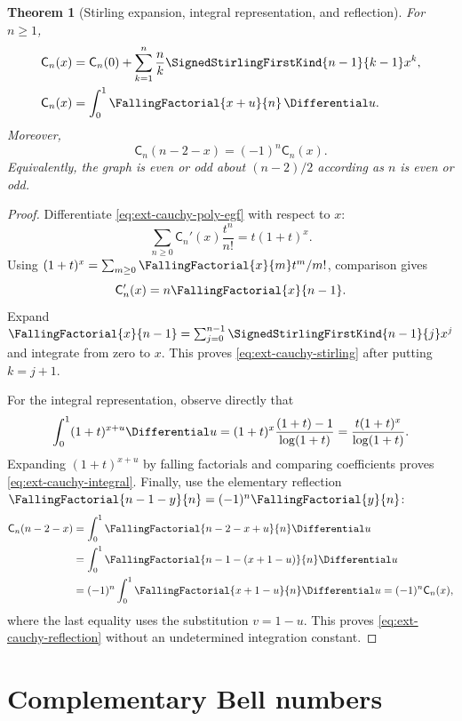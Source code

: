 \documentclass[11pt,a4paper,oneside,openany]{book}
\newtheorem{theorem}{Theorem}[chapter]
\theoremstyle{definition}
\theoremstyle{remark}
\begin{document}
\begin{theorem}[Stirling expansion, integral representation, and reflection]
For \(n\ge1\),
\begin{align}
 \mathsf C_n(x)&=\mathsf C_n(0)
 +\sum_{k=1}^n\frac{n}{k}\SignedStirlingFirstKind{n-1}{k-1}x^k,
 \label{eq:ext-cauchy-stirling}\\
 \mathsf C_n(x)&=\int_0^1\FallingFactorial{x+u}{n}\,\Differential u.
 \label{eq:ext-cauchy-integral}
\end{align}
Moreover,
\begin{equation}\label{eq:ext-cauchy-reflection}
 \mathsf C_n(n-2-x)=(-1)^n\mathsf C_n(x).
\end{equation}
Equivalently, the graph is even or odd about \((n-2)/2\) according as \(n\)
is even or odd.
\end{theorem}
\begin{proof}
Differentiate \eqref{eq:ext-cauchy-poly-egf} with respect to \(x\):
\[
 \sum_{n\ge0}\mathsf C_n'(x)\frac{t^n}{n!}
 =t(1+t)^x.
\]
Using
\((1+t)^x=\sum_{m\ge0}\FallingFactorial{x}{m}t^m/m!\), comparison gives
\begin{equation}\label{eq:ext-cauchy-derivative}
 \mathsf C_n'(x)=n\FallingFactorial{x}{n-1}.
\end{equation}
Expand \(\FallingFactorial{x}{n-1}=\sum_{j=0}^{n-1}\SignedStirlingFirstKind{n-1}{j}x^j\) and integrate from
zero to \(x\).  This proves \eqref{eq:ext-cauchy-stirling} after putting
\(k=j+1\).

For the integral representation, observe directly that
\[
 \int_0^1(1+t)^{x+u}\Differential u
 =(1+t)^x\frac{(1+t)-1}{\log(1+t)}
 =\frac{t(1+t)^x}{\log(1+t)}.
\]
Expanding \((1+t)^{x+u}\) by falling factorials and comparing coefficients
proves \eqref{eq:ext-cauchy-integral}.  Finally, use the elementary reflection
\(\FallingFactorial{n-1-y}{n}=(-1)^n\FallingFactorial{y}{n}\):
\begin{align*}
 \mathsf C_n(n-2-x)
 &=\int_0^1\FallingFactorial{n-2-x+u}{n}\Differential u\\
 &=\int_0^1\FallingFactorial{n-1-(x+1-u)}{n}\Differential u\\
 &=(-1)^n\int_0^1\FallingFactorial{x+1-u}{n}\Differential u
 =(-1)^n\mathsf C_n(x),
\end{align*}
where the last equality uses the substitution \(v=1-u\).  This proves
\eqref{eq:ext-cauchy-reflection} without an undetermined integration constant.
\end{proof}

\section{Complementary Bell numbers}
\end{document}
